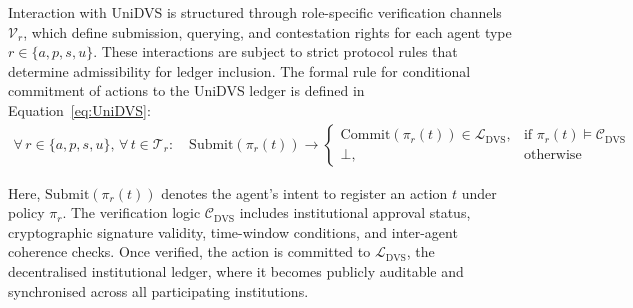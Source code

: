 \documentclass[oneside,10pt]{swissi}
\begin{document}
Interaction with UniDVS is structured through role-specific verification channels $\mathcal{V}_r$, which define submission, querying, and contestation rights for each agent type $r \in \{a, p, s, u\}$. These interactions are subject to strict protocol rules that determine admissibility for ledger inclusion. The formal rule for conditional commitment of actions to the UniDVS ledger is defined in Equation~\ref{eq:UniDVS}:
\begin{align}
\label{eq:UniDVS}
\forall\, r \in \{a, p, s, u\}, \, \forall\, t \in \mathcal{T}_r: \quad
\text{Submit}(\pi_r(t)) \rightarrow
\begin{cases}
\text{Commit}(\pi_r(t)) \in \mathcal{L}_{\text{DVS}}, & \text{if } \pi_r(t) \models \mathcal{C}_{\text{DVS}} \\
\bot, & \text{otherwise}
\end{cases}
\end{align}

Here, $\text{Submit}(\pi_r(t))$ denotes the agent’s intent to register an action $t$ under policy $\pi_r$. The verification logic $\mathcal{C}_{\text{DVS}}$ includes institutional approval status, cryptographic signature validity, time-window conditions, and inter-agent coherence checks. Once verified, the action is committed to $\mathcal{L}_{\text{DVS}}$, the decentralised institutional ledger, where it becomes publicly auditable and synchronised across all participating institutions.
\end{document}
